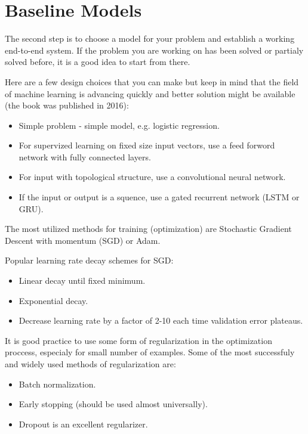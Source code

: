 \documentclass{tufte-handout}
\begin{document}
\section{Baseline Models}\label{sec:baseline-model}
The second step is to choose a model for your problem and establish a working
end-to-end system. If the problem you are working on has been solved or partialy
solved before, it is a good idea to start from there.

Here are a few design choices that you can make but keep in mind that the field of
machine learning is advancing quickly and better solution might be available
(the book was published in 2016):
\begin{itemize}
    \item Simple problem - simple model, e.g. logistic regression.
    \item For supervized learning on fixed size input vectors, use a feed forword
        network with fully connected layers.
    \item For input with topological structure, use a convolutional neural network.
    \item If the input or output is a squence, use a gated recurrent network 
        (LSTM or GRU).
\end{itemize}

The most utilized methods for training (optimization) are Stochastic Gradient
Descent with momentum (SGD) or Adam\cite{DBLP:journals/corr/KingmaB14}.

Popular learning rate decay schemes for SGD:
\begin{itemize}
    \item Linear decay until fixed minimum.
    \item Exponential decay.
    \item Decrease learning rate by a factor of 2-10 each time
         validation error plateaus.
\end{itemize}

It is good practice to use some form of regularization in the optimization proccess,
especialy for small number of examples.
Some of the most successfuly and widely used methods of regularization are:
\begin{itemize}
    \item Batch normalization.
    \item Early stopping (should be used almost universally\cite{goodfellow-et-al-2016}).
    \item Dropout is an excellent regularizer.
\end{itemize}
\end{document}
